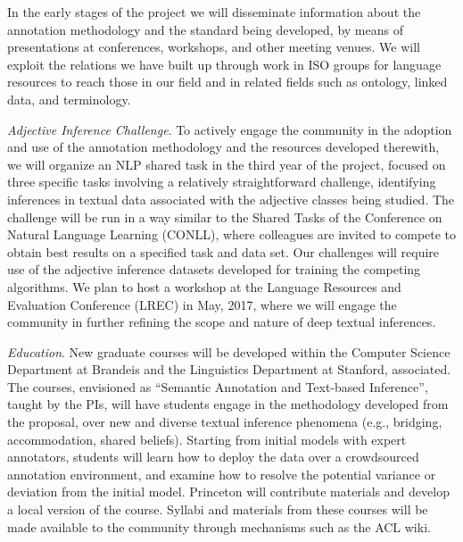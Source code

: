 \documentclass[10pt]{article}
\begin{document}
In the early stages of the project we will disseminate information about the annotation methodology and the standard being developed, by means of presentations at conferences, workshops, and other meeting venues. We will  exploit the relations we have built up through work in ISO groups for language resources to reach 
those in our field and
in related fields such as ontology, linked data, and terminology.  


{\it Adjective Inference Challenge}. To actively engage the community in the adoption and  use of the annotation methodology and the resources developed therewith, we will organize an  NLP shared task in the third year of the project,  focused on three specific tasks involving a relatively straightforward challenge,  identifying inferences in textual data associated with the adjective classes being studied. 
The challenge will be run in a way similar to the Shared Tasks of the Conference on Natural Language Learning (CONLL), where colleagues are invited to compete to obtain best results on a specified task and data set. Our challenges will require use of the adjective inference datasets developed for training the competing algorithms.  We plan to host a workshop at the Language Resources and Evaluation Conference (LREC) in May, 2017, where we will engage the community in further refining the scope and nature of deep textual inferences.

{\it Education}. New graduate courses will be developed within the Computer Science Department at Brandeis and  the Linguistics Department at Stanford, associated. The courses, envisioned as  ``Semantic Annotation and Text-based Inference'', taught by the PIs, will have students engage in the methodology developed from the proposal, over new and diverse textual inference phenomena (e.g., bridging, accommodation, shared beliefs). Starting from initial models with expert annotators, students will learn how to deploy the data over a crowdsourced  annotation environment, and examine how to resolve the potential variance or deviation from the initial model. Princeton will contribute materials and develop a local version of the course.
Syllabi and materials from these courses will be made available to the community through mechanisms such as the ACL wiki.
\end{document}
